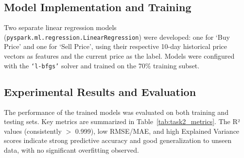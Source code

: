 \subsection{Model Implementation and Training}
\label{subsec:model-implementation-and-training}

Two separate linear regression models (\texttt{pyspark.ml.regression.LinearRegression}) were developed: one for `Buy Price' and one for `Sell Price', using their respective 10-day historical price vectors as features and the current price as the label.
Models were configured with the \texttt{`l-bfgs'} solver and trained on the 70\% training subset.

\subsection{Experimental Results and Evaluation}
\label{subsec:experimental-results-and-evaluation}

The performance of the trained models was evaluated on both training and testing sets.
Key metrics are summarized in Table~\ref{tab:task2_metrics}.
The R² values (consistently $>$ 0.999), low RMSE/MAE, and high Explained Variance scores indicate strong predictive accuracy and good generalization to unseen data, with no significant overfitting observed.

\begin{table}[h]
    \centering
    \caption{LR Performance Metrics for Gold Price Prediction.}
    \renewcommand{\arraystretch}{1} %
    \label{tab:task2_metrics}
\end{table}

